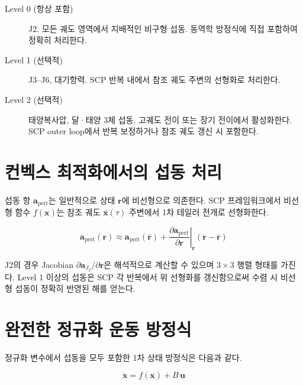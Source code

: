 \documentclass[11pt]{article}
\begin{document}
\begin{description}
  \item[Level 0 (항상 포함)] J2. 모든 궤도 영역에서 지배적인 비구형 섭동.
        동역학 방정식에 직접 포함하여 정확히 처리한다.
  \item[Level 1 (선택적)] J3--J6, 대기항력.
        SCP 반복 내에서 참조 궤도 주변의 선형화로 처리한다.
  \item[Level 2 (선택적)] 태양복사압, 달·태양 3체 섭동.
        고궤도 전이 또는 장기 전이에서 활성화한다.
        SCP outer loop에서 반복 보정하거나 참조 궤도 갱신 시 포함한다.
\end{description}

\section{컨벡스 최적화에서의 섭동 처리}

섭동 항 $\mathbf{a}_\mathrm{pert}$는 일반적으로 상태 $\mathbf{r}$에 비선형으로 의존한다.
SCP 프레임워크에서 비선형 함수 $f(\mathbf{x})$는 참조 궤도
$\bar{\mathbf{x}}(\tau)$ 주변에서 1차 테일러 전개로 선형화한다.

\begin{equation}
  \mathbf{a}_\mathrm{pert}(\mathbf{r}) \approx \mathbf{a}_\mathrm{pert}(\bar{\mathbf{r}})
  + \left.\frac{\partial \mathbf{a}_\mathrm{pert}}{\partial \mathbf{r}}\right|_{\bar{\mathbf{r}}}
  (\mathbf{r} - \bar{\mathbf{r}})
  \label{eq:pert_linearize}
\end{equation}

J2의 경우 Jacobian $\partial \mathbf{a}_{J_2}/\partial \mathbf{r}$은 해석적으로
계산할 수 있으며 $3\times3$ 행렬 형태를 가진다.
Level 1 이상의 섭동은 SCP 각 반복에서 위 선형화를 갱신함으로써
수렴 시 비선형 섭동이 정확히 반영된 해를 얻는다.

\section{완전한 정규화 운동 방정식}

정규화 변수에서 섭동을 모두 포함한 1차 상태 방정식은 다음과 같다.

\begin{equation}
  \dot{\mathbf{x}} = f(\mathbf{x}) + B\,\mathbf{u}
  \label{eq:full_state}
\end{equation}
\end{document}
